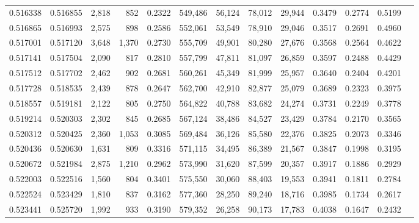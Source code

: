 \begin{tabular}{rrrrrrrrrrrrr}
0.516338 & 0.516855 &  2,818 &   852 &                                     0.2322 & 549,486 &  56,124 &  78,012 &  29,944 & 0.3479 & 0.2774 & 0.5199 \\
0.516865 & 0.516993 &  2,575 &   898 &                                     0.2586 & 552,061 &  53,549 &  78,910 &  29,046 & 0.3517 & 0.2691 & 0.4960 \\
0.517001 & 0.517120 &  3,648 & 1,370 &                                     0.2730 & 555,709 &  49,901 &  80,280 &  27,676 & 0.3568 & 0.2564 & 0.4622 \\
0.517141 & 0.517504 &  2,090 &   817 &                                     0.2810 & 557,799 &  47,811 &  81,097 &  26,859 & 0.3597 & 0.2488 & 0.4429 \\
0.517512 & 0.517702 &  2,462 &   902 &                                     0.2681 & 560,261 &  45,349 &  81,999 &  25,957 & 0.3640 & 0.2404 & 0.4201 \\
0.517728 & 0.518535 &  2,439 &   878 &                                     0.2647 & 562,700 &  42,910 &  82,877 &  25,079 & 0.3689 & 0.2323 & 0.3975 \\
0.518557 & 0.519181 &  2,122 &   805 &                                     0.2750 & 564,822 &  40,788 &  83,682 &  24,274 & 0.3731 & 0.2249 & 0.3778 \\
0.519214 & 0.520303 &  2,302 &   845 &                                     0.2685 & 567,124 &  38,486 &  84,527 &  23,429 & 0.3784 & 0.2170 & 0.3565 \\
0.520312 & 0.520425 &  2,360 & 1,053 &                                     0.3085 & 569,484 &  36,126 &  85,580 &  22,376 & 0.3825 & 0.2073 & 0.3346 \\
0.520436 & 0.520630 &  1,631 &   809 &                                     0.3316 & 571,115 &  34,495 &  86,389 &  21,567 & 0.3847 & 0.1998 & 0.3195 \\
0.520672 & 0.521984 &  2,875 & 1,210 &                                     0.2962 & 573,990 &  31,620 &  87,599 &  20,357 & 0.3917 & 0.1886 & 0.2929 \\
0.522003 & 0.522516 &  1,560 &   804 &                                     0.3401 & 575,550 &  30,060 &  88,403 &  19,553 & 0.3941 & 0.1811 & 0.2784 \\
0.522524 & 0.523429 &  1,810 &   837 &                                     0.3162 & 577,360 &  28,250 &  89,240 &  18,716 & 0.3985 & 0.1734 & 0.2617 \\
0.523441 & 0.525720 &  1,992 &   933 &                                     0.3190 & 579,352 &  26,258 &  90,173 &  17,783 & 0.4038 & 0.1647 & 0.2432 \\

\end{tabular}
